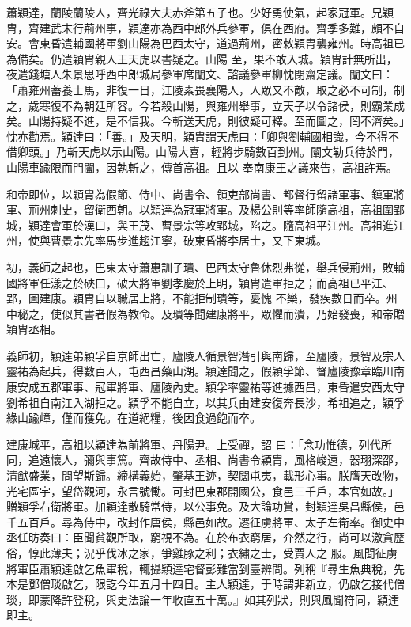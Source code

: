 
\begin{pinyinscope}

 蕭穎達，蘭陵蘭陵人，齊光祿大夫赤斧第五子也。少好勇使氣，起家冠軍。兄穎胄，齊建武末行荊州事，穎達亦為西中郎外兵參軍，俱在西府。齊季多難，頗不自安。會東昏遣輔國將軍劉山陽為巴西太守，道過荊州，密敕穎胄襲雍州。時高祖已為備矣。仍遣穎胄親人王天虎以書疑之。山陽
 至，果不敢入城。穎胄計無所出，夜遣錢塘人朱景思呼西中郎城局參軍席闡文、諮議參軍柳忱閉齋定議。闡文曰：「蕭雍州蓄養士馬，非復一日，江陵素畏襄陽人，人眾又不敵，取之必不可制，制之，歲寒復不為朝廷所容。今若殺山陽，與雍州舉事，立天子以令諸侯，則霸業成矣。山陽持疑不進，是不信我。今斬送天虎，則彼疑可釋。至而圖之，罔不濟矣。」忱亦勸焉。穎達曰：「善。」及天明，穎胄謂天虎曰：「卿與劉輔國相識，今不得不借卿頭。」乃斬天虎以示山陽。山陽大喜，輕將步騎數百到州。闡文勒兵待於門，山陽車踰限而門闔，因執斬之，傳首高祖。且以
 奉南康王之議來告，高祖許焉。



 和帝即位，以穎胄為假節、侍中、尚書令、領吏部尚書、都督行留諸軍事、鎮軍將軍、荊州刺史，留衛西朝。以穎達為冠軍將軍。及楊公則等率師隨高祖，高祖圍郢城，穎達會軍於漢口，與王茂、曹景宗等攻郢城，陷之。隨高祖平江州。高祖進江州，使與曹景宗先率馬步進趨江寧，破東昏將李居士，又下東城。



 初，義師之起也，巴東太守蕭惠訓子璝、巴西太守魯休烈弗從，舉兵侵荊州，敗輔國將軍任漾之於硤口，破大將軍劉孝慶於上明，穎胄遣軍拒之；而高祖已平江、郢，圖建康。穎胄自以職居上將，不能拒制璝等，憂愧
 不樂，發疾數日而卒。州中秘之，使似其書者假為教命。及璝等聞建康將平，眾懼而潰，乃始發喪，和帝贈穎胄丞相。



 義師初，穎達弟穎孚自京師出亡，廬陵人循景智潛引與南歸，至廬陵，景智及宗人靈祐為起兵，得數百人，屯西昌藥山湖。穎達聞之，假穎孚節、督廬陵豫章臨川南康安成五郡軍事、冠軍將軍、廬陵內史。穎孚率靈祐等進據西昌，東昏遣安西太守劉希祖自南江入湖拒之。穎孚不能自立，以其兵由建安復奔長沙，希祖追之，穎孚緣山踰嶂，僅而獲免。在道絕糧，後因食過飽而卒。



 建康城平，高祖以穎達為前將軍、丹陽尹。上受禪，詔
 曰：「念功惟德，列代所同，追遠懷人，彌與事篤。齊故侍中、丞相、尚書令穎胄，風格峻遠，器珝深邵，清猷盛業，問望斯歸。締構義始，肇基王迹，契闊屯夷，載形心事。朕膺天改物，光宅區宇，望岱觀河，永言號慟。可封巴東郡開國公，食邑三千戶，本官如故。」贈穎孚右衛將軍。加穎達散騎常侍，以公事免。及大論功賞，封穎達吳昌縣侯，邑千五百戶。尋為侍中，改封作唐侯，縣邑如故。遷征虜將軍、太子左衛率。御史中丞任昉奏曰：臣聞貧觀所取，窮視不為。在於布衣窮居，介然之行，尚可以激貪歷俗，惇此薄夫；況乎伐冰之家，爭雞豚之利；衣繡之士，受賈人之
 服。風聞征虜將軍臣蕭穎達啟乞魚軍稅，輒攝穎達宅督彭難當到臺辨問。列稱『尋生魚典稅，先本是鄧僧琰啟乞，限訖今年五月十四日。主人穎達，于時謂非新立，仍啟乞接代僧琰，即蒙降許登稅，與史法論一年收直五十萬。』如其列狀，則與風聞符同，穎達即主。




\end{pinyinscope}
